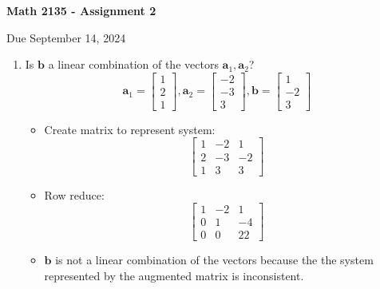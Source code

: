 \documentclass[12pt,a4paper]{exam}
\newcommand{\ba}{\mathbf{a}}
\newcommand{\bb}{\mathbf{b}}
\begin{document}
\begin{center}
\begin{Large}
{\bf Math 2135 - Assignment 2}
\end{Large}

\bigskip
Due September 14, 2024
\end{center}

\thispagestyle{empty}

\bigskip




\printanswers
\renewcommand{\solutiontitle}{\noindent\textbf{Ans:}\enspace}


\begin{enumerate}

\item
 Is $\bb$ a linear combination of the vectors $\ba_1,\ba_2$?
 \[ \ba_1 = \left[ \begin{array}{c} 1 \\ 2 \\ 1 
\end{array} \right],
\ba_2 = \left[ \begin{array}{c} -2 \\ -3 \\ 3 
\end{array} \right],
\bb = \left[ \begin{array}{c} 1 \\ -2 \\ 3 
\end{array} \right] \]

\begin{solution}
  \begin{itemize}
    \item Create matrix to represent system:\\
      \[
      \left[ \begin{array}{ccc}
          1 & -2 & 1 \\ 2 & -3 & -2 \\ 1 & 3 & 3
      \end{array} \right]
      \]
    \item Row reduce:\\
      \[
      \left[ \begin{array}{ccc}
          1 & -2 & 1 \\ 0 & 1 & -4 \\ 0 & 0 & 22
      \end{array} \right]
      \]
    \item $\bb$ is not a linear combination of the vectors because the the system represented by the augmented matrix is inconsistent.
  \end{itemize}
\end{solution}





\end{enumerate}
\end{document}
